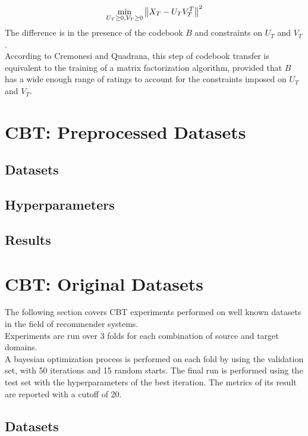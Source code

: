 \begin{equation*}
\min_{U_T \geq 0, V_T \geq 0} \left\lVert X_T - U_T V_T^T\right\rVert^2
\end{equation*}
The difference is in the presence of the codebook $B$ and constraints on $U_T$ and $V_T$.\\
According to Cremonesi and Quadrana, this step of codebook transfer is equivalent to the training of a matrix factorization algorithm, provided that $B$ has a wide enough range of ratings to account for the constraints imposed on $U_T$ and $V_T$.



\section{CBT: Preprocessed Datasets}


\subsection{Datasets}


\subsection{Hyperparameters}


\subsection{Results}



\section{CBT: Original Datasets}

The following section covers CBT experiments performed on well known datasets in the field of recommender systems.\\
Experiments are run over 3 folds for each combination of source and target domains.\\
A bayesian optimization process is performed on each fold by using the validation set, with 50 iterations and 15 random starts. The final run is performed using the test set with the hyperparameters of the best iteration. The metrics of its result are reported with a cutoff of 20.


\subsection{Datasets}

